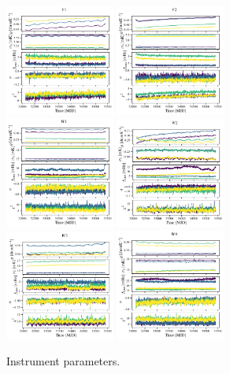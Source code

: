 \documentclass[twocolumn]{../../common/aa}
\begin{document}
\begin{figure}[p]
	\includegraphics[width=0.32\textwidth]{figures/inst_060-WMAP_V1.pdf}
	\includegraphics[width=0.32\textwidth]{figures/inst_060-WMAP_V2.pdf}\\
	\includegraphics[width=0.32\textwidth]{figures/inst_090-WMAP_W1.pdf}
	\includegraphics[width=0.32\textwidth]{figures/inst_090-WMAP_W2.pdf}\\
	\includegraphics[width=0.32\textwidth]{figures/inst_090-WMAP_W3.pdf}
	\includegraphics[width=0.32\textwidth]{figures/inst_090-WMAP_W4.pdf}
	\caption{Instrument parameters.}
	\label{fig:inst_params}
\end{figure}
\end{document}
